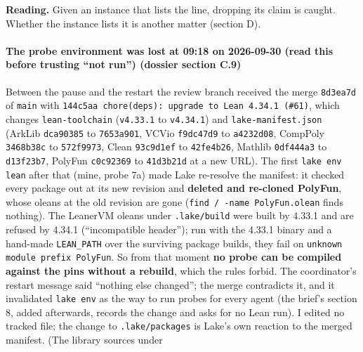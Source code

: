 \textbf{Reading.} Given an instance that lists the line, dropping its claim is caught. Whether the instance lists it is another matter (section D).

\paragraph{The probe environment was lost at 09:18 on 2026-09-30 (read this before trusting \enquote{not run}) (dossier section C.9)}\label{sec:gen-pubinput-C9}

Between the pause and the restart the review branch received the merge \texttt{8d3ea7d} of \texttt{main} with \texttt{1\allowbreak{}4\allowbreak{}4\allowbreak{}c\allowbreak{}5\allowbreak{}a\allowbreak{}a\allowbreak{} c\allowbreak{}h\allowbreak{}o\allowbreak{}r\allowbreak{}e\allowbreak{}(\allowbreak{}d\allowbreak{}e\allowbreak{}p\allowbreak{}s\allowbreak{})\allowbreak{}:\allowbreak{} u\allowbreak{}p\allowbreak{}g\allowbreak{}r\allowbreak{}a\allowbreak{}d\allowbreak{}e\allowbreak{} t\allowbreak{}o\allowbreak{} L\allowbreak{}e\allowbreak{}a\allowbreak{}n\allowbreak{} 4\allowbreak{}.\allowbreak{}3\allowbreak{}4\allowbreak{}.\allowbreak{}1\allowbreak{} (\allowbreak{}\#\allowbreak{}6\allowbreak{}1\allowbreak{})}, which changes \texttt{lean-{}toolchain} (\texttt{v4.\allowbreak{}33.\allowbreak{}1} to \texttt{v4.\allowbreak{}34.\allowbreak{}1}) and \texttt{lake-{}manifest.\allowbreak{}json} (ArkLib \texttt{dca90385} to \texttt{7653a901}, VCVio \texttt{f9dc47d9} to \texttt{a4232d08}, CompPoly \texttt{3468b38c} to \texttt{572f9973}, Clean \texttt{93c9d1ef} to \texttt{42fe4b26}, Mathlib \texttt{0df444a3} to \texttt{d13f23b7}, PolyFun \texttt{c0c92369} to \texttt{41d3b21d} at a new URL). The first \texttt{lake env lean} after that (mine, probe 7a) made Lake re-resolve the manifest: it checked every package out at its new revision and \textbf{deleted and re-cloned PolyFun}, whose oleans at the old revision are gone (\texttt{find /\allowbreak{} -{}name PolyFun.\allowbreak{}olean} finds nothing). The LeanerVM oleans under \texttt{.\allowbreak{}lake/\allowbreak{}build} were built by 4.33.1 and are refused by 4.34.1 (\enquote{incompatible header}); run with the 4.33.1 binary and a hand-made \texttt{LEAN\_\allowbreak{}PATH} over the surviving package builds, they fail on \texttt{u\allowbreak{}n\allowbreak{}k\allowbreak{}n\allowbreak{}o\allowbreak{}w\allowbreak{}n\allowbreak{} m\allowbreak{}o\allowbreak{}d\allowbreak{}u\allowbreak{}l\allowbreak{}e\allowbreak{} p\allowbreak{}r\allowbreak{}e\allowbreak{}f\allowbreak{}i\allowbreak{}x\allowbreak{} \textquotesingle{}\allowbreak{}P\allowbreak{}o\allowbreak{}l\allowbreak{}y\allowbreak{}F\allowbreak{}u\allowbreak{}n\allowbreak{}\textquotesingle{}}. So from that moment \textbf{no probe can be compiled against the pins without a rebuild}, which the rules forbid. The coordinator's restart message said \enquote{nothing else changed}; the merge contradicts it, and it invalidated \texttt{lake env} as the way to run probes for every agent (the brief's section 8, added afterwards, records the change and asks for no Lean run). I edited no tracked file; the change to \texttt{.\allowbreak{}lake/\allowbreak{}packages} is Lake's own reaction to the merged manifest. (The library sources under 